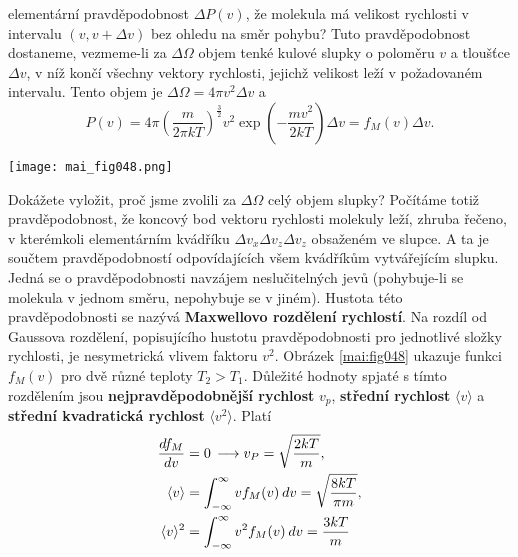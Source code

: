 \begin{example}
  elementární pravděpodobnost \(\Delta P(v)\), že molekula má velikost rychlosti v intervalu \((v, 
  v + \Delta v)\) bez ohledu na směr pohybu? Tuto pravděpodobnost dostaneme, vezmeme-li za 
  \(\Delta\Omega\) objem tenké kulové slupky o poloměru \(v\) a tloušťce \(\Delta v\), v níž končí 
  všechny vektory rychlosti, jejichž velikost leží v požadovaném intervalu. Tento objem je 
  \(\Delta\Omega = 4\pi v^2\Delta v\) a
  \begin{equation*}
    P(v) = 4\pi\left(\dfrac{m}{2\pi kT}\right)^{\frac{3}{2}}v^2
               \exp\left(- \dfrac{mv^2}{2 kT}\right)\Delta v = f_M(v)\Delta v. 
  \end{equation*}

  {\centering
   \captionsetup{type=figure}
   \texttt{[image: mai\_fig048.png]}
  \par}
  
  Dokážete vyložit, proč jsme zvolili za \(\Delta\Omega\) celý objem slupky? Počítáme totiž 
  pravděpodobnost, že koncový bod vektoru rychlosti molekuly leží, zhruba řečeno, v kterémkoli 
  elementárním kvádříku \(\Delta v_x\Delta v_z\Delta v_z\) obsaženém ve slupce. A ta je součtem 
  pravděpodobností odpovídajících všem kvádříkům vytvářejícím slupku. Jedná se o pravděpodobnosti 
  navzájem neslučitelných jevů (pohybuje-li se molekula v jednom směru, nepohybuje se v jiném). 
  Hustota této pravděpodobnosti se nazývá \textbf{Maxwellovo rozdělení rychlostí}. Na rozdíl od 
  Gaussova rozdělení, popisujícího hustotu pravděpodobnosti pro jednotlivé složky rychlosti, je 
  nesymetrická vlivem faktoru \(v^2\). Obrázek \ref{mai:fig048} ukazuje funkci \(f_M(v)\) pro dvě 
  různé teploty \(T_2 > T_1\). Důležité hodnoty spjaté s tímto rozdělením jsou 
  \textbf{nejpravděpodobnější rychlost} \(v_p\), \textbf{střední rychlost} \(\langle v \rangle\) a 
  \textbf{střední kvadratická rychlost} \(\langle v^2 \rangle\). Platí
  \begin{align*}
    \dfrac{d f_M}{d v}        &= 0\, \longrightarrow v_P = \sqrt{\dfrac{2kT}{m}},                      \\
    \langle v \rangle   &= \int_{-\infty}^{\infty}vf_M(v)\hspace{2pt}dv = \sqrt{\dfrac{8kT}{\pi m}},     \\
    \langle v \rangle^2 &= \int_{-\infty}^{\infty}v^2f_M(v)\hspace{2pt}dv = \dfrac{3kT}{m}
  \end{align*}
\normalsize
\end{example}
